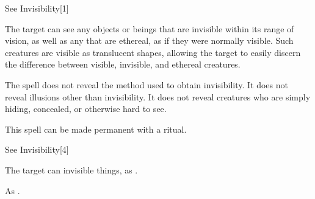 \begin{spellsection}{See Invisibility}[1]
    \begin{spellheader}
    \end{spellheader}
    \begin{spellcontent}
        \begin{spelltargetinginfo}
        \end{spelltargetinginfo}
        \begin{spelleffects}
            \spelleffect The target can see any objects or beings that are invisible within its range of vision, as well as any that are ethereal, as if they were normally visible. Such creatures are visible as translucent shapes, allowing the target to easily discern the difference between visible, invisible, and ethereal creatures.
            \spelldur \durpersonallong
        \end{spelleffects}
    \end{spellcontent}
    \begin{spellfooter}
        \spellnotes The spell does not reveal the method used to obtain invisibility. It does not reveal illusions other than invisibility. It does not reveal creatures who are simply hiding, concealed, or otherwise hard to see.

        This spell can be made permanent with a  ritual.
        \miscastexplode
    \end{spellfooter}
\end{spellsection}

\begin{spellsection}[Mass]{See Invisibility}[4]
    \begin{spellheader}
    \end{spellheader}
    \begin{spellcontent}
        \begin{spelltargetinginfo}
        \end{spelltargetinginfo}
        \begin{spelleffects}
            \spelleffect The target can invisible things, as .
            \spelldur \durshort
        \end{spelleffects}
    \end{spellcontent}
    \begin{spellfooter}
        \spellnotes As .
        \miscastexplode
    \end{spellfooter}
\end{spellsection}

